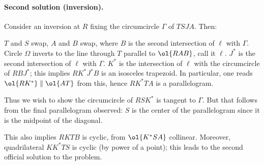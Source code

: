 \paragraph{Second solution (inversion).}
Consider an inversion at $R$ fixing the circumcircle $\Gamma$ of $TSJA$.
Then:
\begin{itemize}
  \ii $T$ and $S$ swap,
  \ii $A$ and $B$ swap, where $B$ is the second intersection
  of $\ell$ with $\Gamma$.
  \ii Circle $\Omega$ inverts to the line through $T$
  parallel to $\ol{RAB}$, call it $\ell$.
  \ii $J^\ast$ is the second intersection of $\ell$ with $\Gamma$.
  \ii $K^\ast$ is the intersection of $\ell$ with the circumcircle
  of $RBJ^\ast$; this implies $RK^\ast J^\ast B$ is an isosceles trapezoid.
  In particular, one reads $\ol{RK^\ast} \parallel \ol{AT}$ from this,
  hence $RK^\ast TA$ is a parallelogram.
\end{itemize}
Thus we wish to show the circumcircle of $RSK^\ast$ is tangent to $\Gamma$.
But that follows from the final parallelogram observed:
$S$ is the center of the parallelogram since it is the midpoint of the diagonal.

\begin{remark*}
  This also implies $RKTB$ is cyclic, from $\ol{K^\ast SA}$ collinear.
  Moreover, quadrilateral $KK^\ast TS$ is cyclic (by power of a point);
  this leads to the second official solution to the problem.
\end{remark*}
